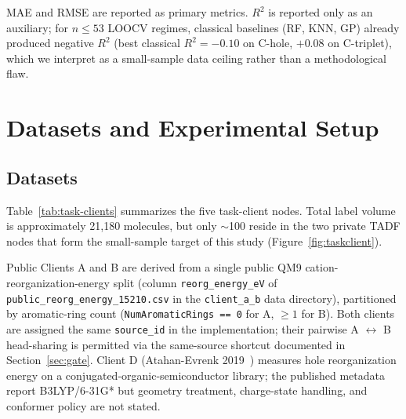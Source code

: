\documentclass[11pt,a4paper]{article}
\begin{document}
MAE and RMSE are reported as primary metrics. $R^2$ is reported only as an auxiliary; for $n \le 53$ LOOCV regimes, classical baselines (RF, KNN, GP) already produced negative $R^2$ (best classical $R^2 = -0.10$ on C-hole, $+0.08$ on C-triplet), which we interpret as a small-sample data ceiling rather than a methodological flaw.

\section{Datasets and Experimental Setup}\label{sec:datasets}

\subsection{Datasets}\label{sec:data}

Table~\ref{tab:task-clients} summarizes the five task-client nodes. Total label volume is approximately 21{,}180 molecules, but only $\sim$100 reside in the two private TADF nodes that form the small-sample target of this study (Figure~\ref{fig:taskclient}).

\begin{sloppypar}
Public Clients A and B are derived from a single public QM9 cation-reorganization-energy split (column \texttt{reorg\_energy\_eV} of \texttt{public\_reorg\_energy\_15210.csv} in the \texttt{client\_a\_b} data directory), partitioned by aromatic-ring count (\texttt{NumAromaticRings == 0} for A, $\geq 1$ for B). Both clients are assigned the same \texttt{source\_id} in the implementation; their pairwise A $\leftrightarrow$ B head-sharing is permitted via the same-source shortcut documented in Section~\ref{sec:gate}. Client D (Atahan-Evrenk 2019~\citep{AtahanEvrenk2019_RE}) measures hole reorganization energy on a conjugated-organic-semiconductor library; the published metadata report B3LYP/6-31G* but geometry treatment, charge-state handling, and conformer policy are not stated.
\end{sloppypar}
\end{document}
